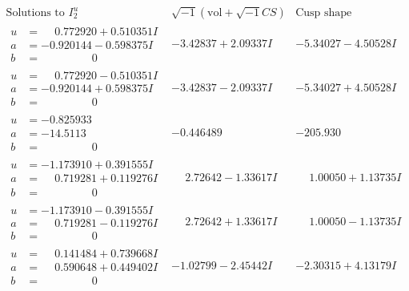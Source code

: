 \documentclass[1p]{elsarticle_modified}
\theoremstyle{definition}
\newcommand{\I}{\sqrt{-1}}
\begin{document}
$$\begin{array}{c|c|c}  
\text{Solutions to }I^u_{2}& \I (\text{vol} + \sqrt{-1}CS) & \text{Cusp shape}\\
 \hline 
\begin{aligned}
u &= \phantom{-}0.772920 + 0.510351 I \\
a &= -0.920144 - 0.598375 I \\
b &= \phantom{-0.000000 } 0\end{aligned}
 & -3.42837 + 2.09337 I & -5.34027 - 4.50528 I \\ \hline\begin{aligned}
u &= \phantom{-}0.772920 - 0.510351 I \\
a &= -0.920144 + 0.598375 I \\
b &= \phantom{-0.000000 } 0\end{aligned}
 & -3.42837 - 2.09337 I & -5.34027 + 4.50528 I \\ \hline\begin{aligned}
u &= -0.825933\phantom{ +0.000000I} \\
a &= -14.5113\phantom{ +0.000000I} \\
b &= \phantom{-0.000000 } 0\end{aligned}
 & -0.446489\phantom{ +0.000000I} & -205.930\phantom{ +0.000000I} \\ \hline\begin{aligned}
u &= -1.173910 + 0.391555 I \\
a &= \phantom{-}0.719281 + 0.119276 I \\
b &= \phantom{-0.000000 } 0\end{aligned}
 & \phantom{-}2.72642 - 1.33617 I & \phantom{-}1.00050 + 1.13735 I \\ \hline\begin{aligned}
u &= -1.173910 - 0.391555 I \\
a &= \phantom{-}0.719281 - 0.119276 I \\
b &= \phantom{-0.000000 } 0\end{aligned}
 & \phantom{-}2.72642 + 1.33617 I & \phantom{-}1.00050 - 1.13735 I \\ \hline\begin{aligned}
u &= \phantom{-}0.141484 + 0.739668 I \\
a &= \phantom{-}0.590648 + 0.449402 I \\
b &= \phantom{-0.000000 } 0\end{aligned}
 & -1.02799 - 2.45442 I & -2.30315 + 4.13179 I \\ \hline\begin{aligned}

\end{aligned}
\end{array}$$
\end{document}
